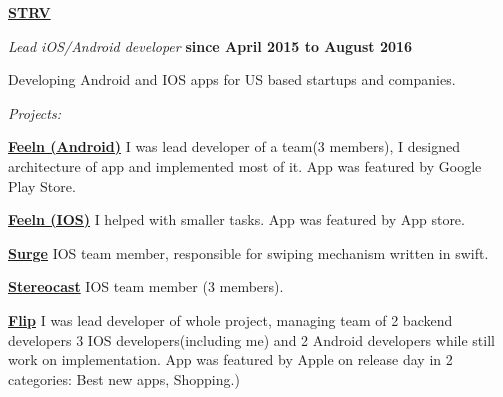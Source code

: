 \documentclass[10pt]{article}
\newenvironment{outerlist}[0]%
        {\begin{itemize}}
        {\end{itemize}
         \vspace{-.6\baselineskip}}
\newenvironment{innerlist}[0]%
        {\begin{compactitem}}
        {\end{compactitem}}
\newcommand{\blankline}{\quad\pagebreak[2]}
\begin{document}
\href{http://www.strv.com/}{\textbf{STRV}}
\begin{outerlist}
  \item[] \textit{Lead iOS/Android developer}%
          \hfill \textbf{since April 2015 to August 2016}
  \begin{innerlist}
    \item[] Developing Android and IOS apps for US based startups
and companies.
  \end{innerlist}
    \item[] \textit{Projects:}%
    	 \begin{innerlist}
	 	 \item[]  \href{https://play.google.com/store/apps/details?id=com.feeln.android}{\textbf{Feeln (Android)}} \newline
		 I was lead developer of a team(3 members), I designed architecture of app
and implemented most of it. App was featured by Google Play Store.
		\newline
	 	 \item[]  \href{https://itunes.apple.com/us/app/feeln/id472567577?mt=8}{\textbf{Feeln (IOS)}} \newline
		 I helped with smaller tasks. App was featured by App store.
		 \newline
	 	 \item[]  \href{https://itunes.apple.com/us/app/surge-gay-dating-app-for-gay/id709551897?mt=8}{\textbf{Surge}} \newline
		 IOS team member, responsible for swiping mechanism written in
swift.
		\newline
	 	 \item[]  \href{https://itunes.apple.com/us/app/stereocast-exclusive-music/id1027457656?mt=8}{\textbf{Stereocast}} \newline
		 IOS team member (3 members).
		 \newline
	 	 \item[]  \href{https://itunes.apple.com/us/app/flip-everyones-sneaker-connect/id961287853?mt=8}{\textbf{Flip}} \newline
		  I was lead developer of whole project, managing
team of 2 backend developers 3 IOS developers(including me) and 2
Android developers while still work on implementation. App was featured
by Apple on release day in 2 categories: Best new apps, Shopping.)
	 \end{innerlist}
\end{outerlist}

\blankline
\end{document}
